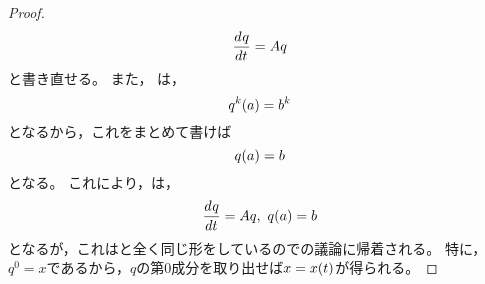 \documentclass[b5paper,draft,oneside,openany]{ltjsbook} %
\begin{document}
\begin{prop}[定数係数線型斉次常微分方程式の解の存在と一意性]
\begin{proof}
\begin{equation}
            \frac{d^{} q}{d t^{}}=Aq
        \end{equation}
        と書き直せる。
        また，
        は，
        \begin{equation}
            \fun{q^k}{a}=b^k
        \end{equation}
        となるから，これをまとめて書けば
        \begin{equation}
            \fun{q}{a}=b
        \end{equation}
        となる。
        これにより，は，
        \begin{equation}
            \diff{q}{t}=Aq,\
            \fun{q}{a}=b
        \end{equation}
        となるが，これはと全く同じ形をしているのでの議論に帰着される。
        特に，$q^0=x$であるから，$q$の第0成分を取り出せば$x=\fun{x}{t}$が得られる。
    \end{proof}
\end{prop}
\end{document}

